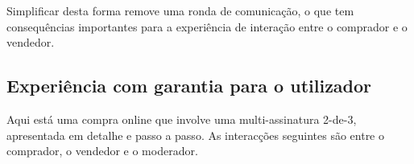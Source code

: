 Simplificar desta forma remove uma ronda de comunicação, o que tem consequências importantes para a experiência de interação entre o comprador e o vendedor. 


\subsection{Experiência com garantia para o utilizador}
\label{subsec:escrowed-marketplace-escrow-user-experience}

Aqui está uma compra online que involve uma multi-assinatura 2-de-3, apresentada em detalhe e passo a passo. As interacções seguintes são entre o comprador, o vendedor e o moderador.
\iffalse

